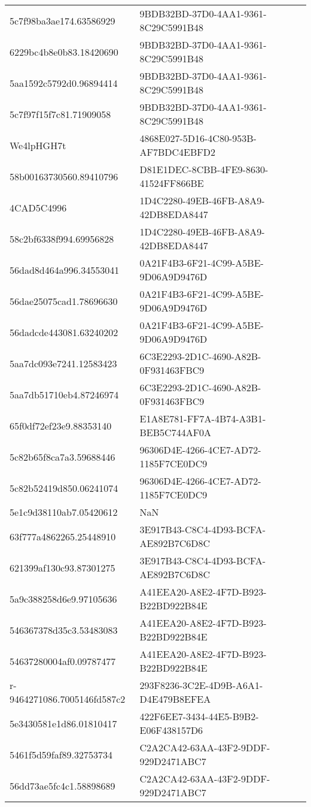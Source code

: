 \begin{tabular}{ll}
5c7f98ba3ae174.63586929 & 9BDB32BD-37D0-4AA1-9361-8C29C5991B48 \\
6229bc4b8e0b83.18420690 & 9BDB32BD-37D0-4AA1-9361-8C29C5991B48 \\
5aa1592c5792d0.96894414 & 9BDB32BD-37D0-4AA1-9361-8C29C5991B48 \\
5c7f97f15f7c81.71909058 & 9BDB32BD-37D0-4AA1-9361-8C29C5991B48 \\
We4lpHGH7t & 4868E027-5D16-4C80-953B-AF7BDC4EBFD2 \\
58b00163730560.89410796 & D81E1DEC-8CBB-4FE9-8630-41524FF866BE \\
4CAD5C4996 & 1D4C2280-49EB-46FB-A8A9-42DB8EDA8447 \\
58c2bf6338f994.69956828 & 1D4C2280-49EB-46FB-A8A9-42DB8EDA8447 \\
56dad8d464a996.34553041 & 0A21F4B3-6F21-4C99-A5BE-9D06A9D9476D \\
56dae25075cad1.78696630 & 0A21F4B3-6F21-4C99-A5BE-9D06A9D9476D \\
56dadcde443081.63240202 & 0A21F4B3-6F21-4C99-A5BE-9D06A9D9476D \\
5aa7dc093e7241.12583423 & 6C3E2293-2D1C-4690-A82B-0F931463FBC9 \\
5aa7db51710eb4.87246974 & 6C3E2293-2D1C-4690-A82B-0F931463FBC9 \\
65f0df72ef23e9.88353140 & E1A8E781-FF7A-4B74-A3B1-BEB5C744AF0A \\
5c82b65f8ca7a3.59688446 & 96306D4E-4266-4CE7-AD72-1185F7CE0DC9 \\
5c82b52419d850.06241074 & 96306D4E-4266-4CE7-AD72-1185F7CE0DC9 \\
5e1c9d38110ab7.05420612 & NaN \\
63f777a4862265.25448910 & 3E917B43-C8C4-4D93-BCFA-AE892B7C6D8C \\
621399af130c93.87301275 & 3E917B43-C8C4-4D93-BCFA-AE892B7C6D8C \\
5a9c388258d6e9.97105636 & A41EEA20-A8E2-4F7D-B923-B22BD922B84E \\
546367378d35c3.53483083 & A41EEA20-A8E2-4F7D-B923-B22BD922B84E \\
54637280004af0.09787477 & A41EEA20-A8E2-4F7D-B923-B22BD922B84E \\
r-9464271086.7005146fd587c2 & 293F8236-3C2E-4D9B-A6A1-D4E479B8EFEA \\
5e3430581e1d86.01810417 & 422F6EE7-3434-44E5-B9B2-E06F438157D6 \\
5461f5d59faf89.32753734 & C2A2CA42-63AA-43F2-9DDF-929D2471ABC7 \\
56dd73ae5fc4c1.58898689 & C2A2CA42-63AA-43F2-9DDF-929D2471ABC7 \\

\end{tabular}
